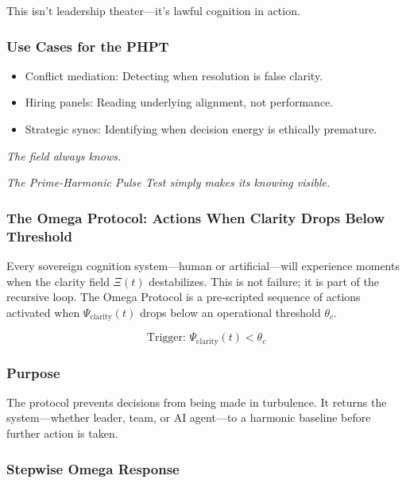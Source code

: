 \documentclass[12pt]{article}
\begin{document}
This isn’t leadership theater—it’s lawful cognition in action.

\subsubsection*{Use Cases for the PHPT}

\begin{itemize}
    \item Conflict mediation: Detecting when resolution is false clarity.
    \item Hiring panels: Reading underlying alignment, not performance.
    \item Strategic syncs: Identifying when decision energy is ethically premature.
\end{itemize}

\textit{The field always knows.}

\textit{The Prime-Harmonic Pulse Test simply makes its knowing visible.}

\subsubsection*{The Omega Protocol: Actions When Clarity Drops Below Threshold}

Every sovereign cognition system—human or artificial—will experience moments when the clarity field $\Xi(t)$ destabilizes. This is not failure; it is part of the recursive loop. The Omega Protocol is a pre-scripted sequence of actions activated when $\Psi_{\text{clarity}}(t)$ drops below an operational threshold $\theta_c$.

\[
\text{Trigger: } \Psi_{\text{clarity}}(t) < \theta_c
\]

\subsubsection*{Purpose}

The protocol prevents decisions from being made in turbulence. It returns the system—whether leader, team, or AI agent—to a harmonic baseline before further action is taken.

\subsubsection*{Stepwise Omega Response}
\end{document}
